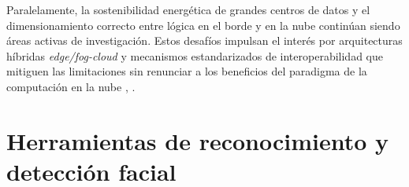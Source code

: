 Paralelamente, la sostenibilidad energética de grandes centros de datos y el dimensionamiento correcto entre lógica en el borde y en la nube continúan siendo áreas activas de investigación.  Estos desafíos impulsan el interés por arquitecturas híbridas \emph{edge/fog-cloud} y mecanismos estandarizados de interoperabilidad que mitiguen las limitaciones sin renunciar a los beneficios del paradigma de la computación en la nube \cite{shehabi_2024}, \cite{fernando_2025}.

\section{Herramientas de reconocimiento y detección facial}


